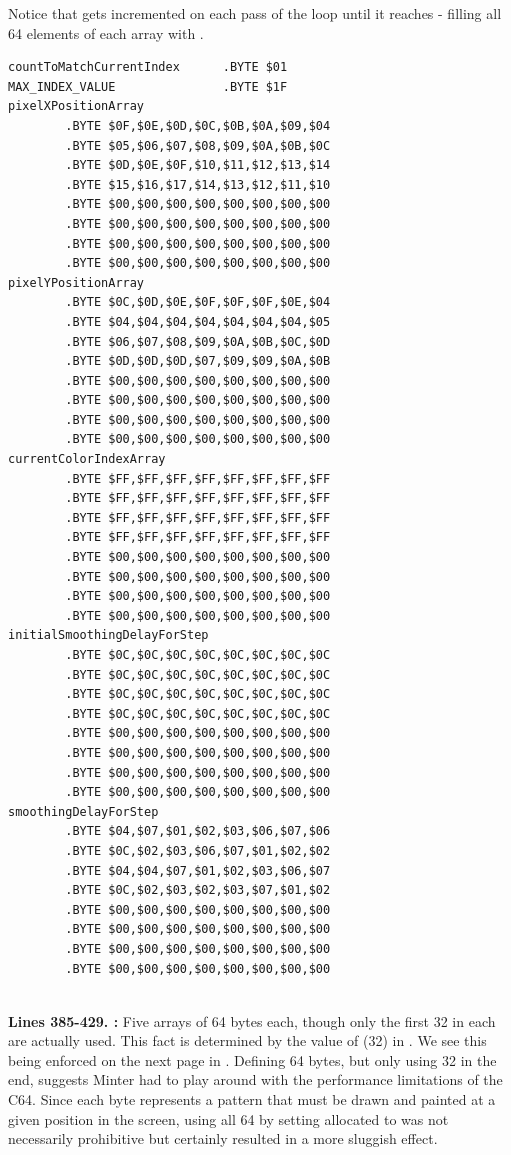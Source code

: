 Notice that  gets incremented on each pass of the loop until it reaches  - filling all 64 elements of each array with
.
\clearpage
\begin{lstlisting}[caption = The pixel buffers\, each 64 bytes long though only 32 bytes are used in this version thanks to \icode{MAX\_INDEX\_VALUE}
being set to \icode{\$1F} (32).]
countToMatchCurrentIndex      .BYTE $01
MAX_INDEX_VALUE               .BYTE $1F
pixelXPositionArray   
        .BYTE $0F,$0E,$0D,$0C,$0B,$0A,$09,$04
        .BYTE $05,$06,$07,$08,$09,$0A,$0B,$0C
        .BYTE $0D,$0E,$0F,$10,$11,$12,$13,$14
        .BYTE $15,$16,$17,$14,$13,$12,$11,$10
        .BYTE $00,$00,$00,$00,$00,$00,$00,$00
        .BYTE $00,$00,$00,$00,$00,$00,$00,$00
        .BYTE $00,$00,$00,$00,$00,$00,$00,$00
        .BYTE $00,$00,$00,$00,$00,$00,$00,$00
pixelYPositionArray   
        .BYTE $0C,$0D,$0E,$0F,$0F,$0F,$0E,$04
        .BYTE $04,$04,$04,$04,$04,$04,$04,$05
        .BYTE $06,$07,$08,$09,$0A,$0B,$0C,$0D
        .BYTE $0D,$0D,$0D,$07,$09,$09,$0A,$0B
        .BYTE $00,$00,$00,$00,$00,$00,$00,$00
        .BYTE $00,$00,$00,$00,$00,$00,$00,$00
        .BYTE $00,$00,$00,$00,$00,$00,$00,$00
        .BYTE $00,$00,$00,$00,$00,$00,$00,$00
currentColorIndexArray   
        .BYTE $FF,$FF,$FF,$FF,$FF,$FF,$FF,$FF
        .BYTE $FF,$FF,$FF,$FF,$FF,$FF,$FF,$FF
        .BYTE $FF,$FF,$FF,$FF,$FF,$FF,$FF,$FF
        .BYTE $FF,$FF,$FF,$FF,$FF,$FF,$FF,$FF
        .BYTE $00,$00,$00,$00,$00,$00,$00,$00
        .BYTE $00,$00,$00,$00,$00,$00,$00,$00
        .BYTE $00,$00,$00,$00,$00,$00,$00,$00
        .BYTE $00,$00,$00,$00,$00,$00,$00,$00
initialSmoothingDelayForStep   
        .BYTE $0C,$0C,$0C,$0C,$0C,$0C,$0C,$0C
        .BYTE $0C,$0C,$0C,$0C,$0C,$0C,$0C,$0C
        .BYTE $0C,$0C,$0C,$0C,$0C,$0C,$0C,$0C
        .BYTE $0C,$0C,$0C,$0C,$0C,$0C,$0C,$0C
        .BYTE $00,$00,$00,$00,$00,$00,$00,$00
        .BYTE $00,$00,$00,$00,$00,$00,$00,$00
        .BYTE $00,$00,$00,$00,$00,$00,$00,$00
        .BYTE $00,$00,$00,$00,$00,$00,$00,$00
smoothingDelayForStep   
        .BYTE $04,$07,$01,$02,$03,$06,$07,$06
        .BYTE $0C,$02,$03,$06,$07,$01,$02,$02
        .BYTE $04,$04,$07,$01,$02,$03,$06,$07
        .BYTE $0C,$02,$03,$02,$03,$07,$01,$02
        .BYTE $00,$00,$00,$00,$00,$00,$00,$00
        .BYTE $00,$00,$00,$00,$00,$00,$00,$00
        .BYTE $00,$00,$00,$00,$00,$00,$00,$00
        .BYTE $00,$00,$00,$00,$00,$00,$00,$00


\end{lstlisting}
\clearpage

\textbf{Lines 385-429. :} Five arrays of 64 bytes each, though only the first 32 in each are actually used. This fact is determined
by the value of  (32) in . We see this being enforced on the next page in
. Defining 64 bytes, but only using 32 in the end, suggests Minter had to play around
with the performance limitations of the C64. Since each byte represents a pattern that must be drawn and painted
at a given position in the screen, using all 64 by setting allocated  to  
was not necessarily prohibitive but certainly resulted in a more sluggish effect.

